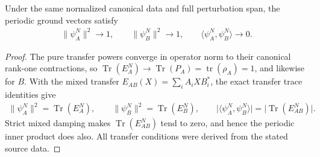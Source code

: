 \begin{lemma}
    \label{lem:uncle_ground_gram_limits}
    \leanok
    Under the same normalized canonical data and full perturbation span,
    the periodic ground vectors satisfy
    \begin{align}
        \lVert\psi_A^N\rVert^2\longrightarrow1,\qquad
        \lVert\psi_B^N\rVert^2\longrightarrow1,\qquad
        \langle\psi_A^N,\psi_B^N\rangle\longrightarrow0.
    \end{align}
\end{lemma}
\begin{proof}
    \leanok
    The pure transfer powers converge in operator norm to their
    canonical rank-one contractions, so
    $\operatorname{Tr}(E_A^N)\to\operatorname{Tr}(P_A)
        =\operatorname{tr}(\rho_A)=1$, and likewise for $B$. With the mixed
    transfer $E_{AB}(X)=\sum_iA_iXB_i^*$, the exact transfer trace
    identities give
    \begin{align}
        \lVert\psi_A^N\rVert^2=\operatorname{Tr}(E_A^N),\qquad
        \lVert\psi_B^N\rVert^2=\operatorname{Tr}(E_B^N),\qquad
        \lvert\langle\psi_A^N,\psi_B^N\rangle\rvert
        =\lvert\operatorname{Tr}(E_{AB}^N)\rvert.
        \label{eq:uncle_ground_gram_traces}
    \end{align}
    Strict mixed damping makes $\operatorname{Tr}(E_{AB}^N)$ tend to zero,
    and hence the periodic inner product does also. All transfer conditions were derived from the stated source data.
\end{proof}
